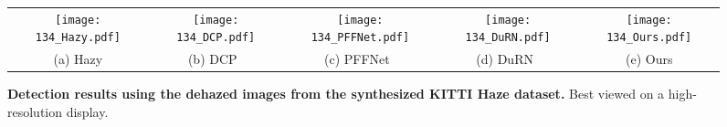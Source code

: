 \documentclass[10pt,twocolumn,letterpaper]{article}
\begin{document}
  \begin{figure*}[!t]
  \footnotesize
  \centering
  \begin{tabular}{ccccc}
        \texttt{[image: 134\_Hazy.pdf]} & \hspace{-4mm}
        \texttt{[image: 134\_DCP.pdf]} & \hspace{-4mm}
        \texttt{[image: 134\_PFFNet.pdf]} & \hspace{-4mm}
        \texttt{[image: 134\_DuRN.pdf]} & \hspace{-4mm}
        \texttt{[image: 134\_Ours.pdf]}
     \\
        (a) Hazy & \hspace{-4mm}
        (b) DCP~\cite{He_dark} & \hspace{-4mm}
        (c) PFFNet~\cite{PFFNet} & \hspace{-4mm}
        (d) DuRN~\cite{DuRN} & \hspace{-4mm}
        (e) Ours
  \end{tabular}
  \caption{
  \textbf{Detection results using the dehazed images from the synthesized KITTI Haze dataset.}
Best viewed on a high-resolution display.
  }
  \label{fig:visual_results_detection_hazy}
  \vspace{-3mm}
  \end{figure*}
  
\end{document}

